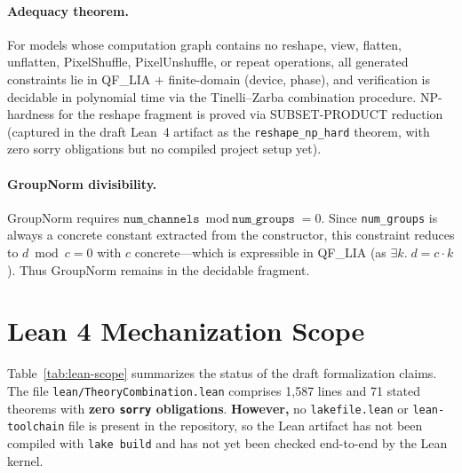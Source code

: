 \documentclass[11pt]{article}
\begin{document}
\paragraph{Adequacy theorem.}
For models whose computation graph contains no reshape, view, flatten,
unflatten, PixelShuffle, PixelUnshuffle, or repeat operations,
all generated constraints lie in
QF\_LIA $+$ finite-domain (device, phase), and verification is
decidable in polynomial time via the Tinelli--Zarba combination
procedure.  NP-hardness for the reshape fragment is proved via
SUBSET-PRODUCT reduction (captured in the draft Lean~4 artifact as the
\texttt{reshape\_np\_hard} theorem, with zero sorry obligations but no
compiled project setup yet).

\paragraph{GroupNorm divisibility.}
GroupNorm requires $\texttt{num\_channels} \bmod \texttt{num\_groups} = 0$.
Since \texttt{num\_groups} is always a concrete constant extracted from
the constructor, this constraint reduces to
$d \bmod c = 0$ with $c$ concrete---which is expressible in QF\_LIA
(as $\exists k.\; d = c \cdot k$).  Thus GroupNorm remains in the
decidable fragment.


\section{Lean 4 Mechanization Scope}\label{app:lean-scope}

Table~\ref{tab:lean-scope} summarizes the status of the draft
formalization claims. The file \texttt{lean/TheoryCombination.lean}
comprises 1,587 lines and 71 stated theorems with \textbf{zero
\texttt{sorry} obligations}. \textbf{However,} no
\texttt{lakefile.lean} or \texttt{lean-toolchain} file is present in
the repository, so the Lean artifact has not been compiled with
\texttt{lake build} and has not yet been checked end-to-end by the Lean
kernel.
\end{document}
